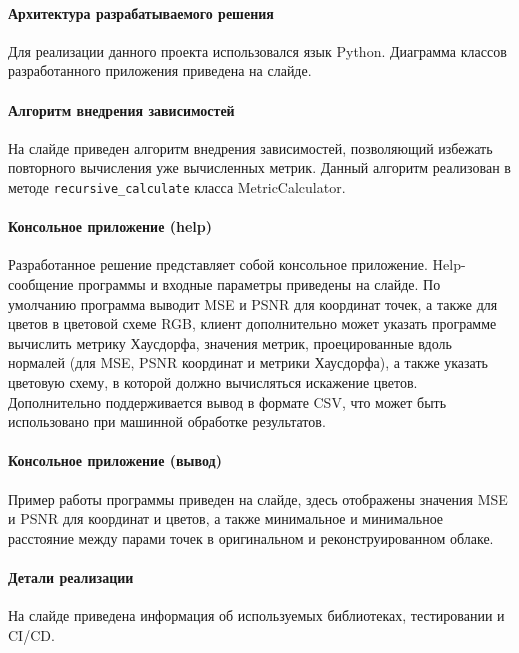 \documentclass[a4paper,12pt]{extreport}
\begin{document}
\paragraph{Архитектура разрабатываемого решения}

Для реализации данного проекта использовался язык Python. Диаграмма классов
разработанного приложения приведена на слайде.

\paragraph{Алгоритм внедрения зависимостей}

На слайде приведен алгоритм внедрения зависимостей, позволяющий избежать
повторного вычисления уже вычисленных метрик. Данный алгоритм реализован в
методе \texttt{recursive\_calculate} класса MetricCalculator.

\paragraph{Консольное приложение (help)}

Разработанное решение представляет собой консольное приложение. Help-сообщение
программы и входные параметры приведены на слайде. По умолчанию программа
выводит MSE и PSNR для координат точек, а также для цветов в цветовой схеме RGB,
клиент дополнительно может указать программе вычислить метрику Хаусдорфа,
значения метрик, проецированные вдоль нормалей (для MSE, PSNR координат и
метрики Хаусдорфа), а также указать цветовую схему, в которой должно вычисляться
искажение цветов. Дополнительно поддерживается вывод в формате CSV, что может
быть использовано при машинной обработке результатов.

\paragraph{Консольное приложение (вывод)}

Пример работы программы приведен на слайде, здесь отображены значения MSE и PSNR
для координат и цветов, а также минимальное и минимальное расстояние между
парами точек в оригинальном и реконструированном облаке.

\paragraph{Детали реализации}

На слайде приведена информация об используемых библиотеках, тестировании и
CI/CD.
\end{document}
